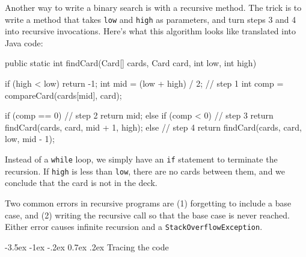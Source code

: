 \documentclass[12pt]{book}
\makeatletter
\theoremstyle{exercise}
\newcommand{\java}[1]{\verb"#1"}
\renewcommand{\section}{\@startsection{section}{1}{\z@}%
    {-3.5ex \@plus -1ex \@minus -.2ex}%
    {0.7ex \@plus.2ex}%
    {\normalfont\Large\bfseries}}
\newcommand{\java}[1]{\lstinline{#1}} %
\makeatother
\begin{document}


Another way to write a binary search is with a recursive method.
The trick is to write a method that takes \java{low} and \java{high} as parameters, and turn steps 3 and 4 into recursive invocations.
Here's what this algorithm looks like translated into Java code:

\begin{code}
public static int findCard(Card[] cards, Card card,
                           int low, int high) {
    if (high < low) {
        return -1;
    }
    int mid = (low + high) / 2;                       // step 1
    int comp = compareCard(cards[mid], card);

    if (comp == 0) {                                  // step 2
        return mid;
    } else if (comp < 0) {                            // step 3
        return findCard(cards, card, mid + 1, high);
    } else {                                          // step 4
        return findCard(cards, card, low, mid - 1);
    }
}
\end{code}


Instead of a \java{while} loop, we simply have an \java{if} statement to terminate the recursion.
If \java{high} is less than \java{low}, there are no cards between them, and we conclude that the card is not in the deck.


Two common errors in recursive programs are (1) forgetting to include a base case, and (2) writing the recursive call so that the base case is never reached.
Either error causes infinite recursion and a \java{StackOverflowException}.

\section{Tracing the code}
\end{document}
